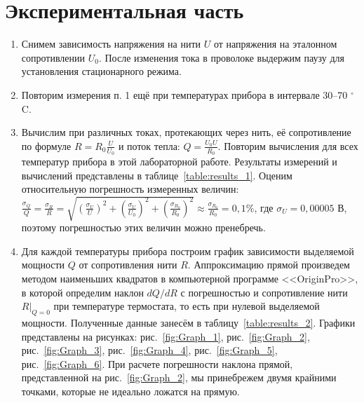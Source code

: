 \documentclass[a4paper,12pt]{article} %
\begin{document}
\section{Экспериментальная часть}
\begin{enumerate}

\item
	Снимем зависимость напряжения на нити $U$ от напряжения на 	эталонном сопротивлении 	$U_0$. После изменения тока в проволоке выдержим паузу для установления стационарного 	режима.
	
\item
	Повторим измерения п. 1 ещё при температурах прибора в интервале 30--70 $^\circ$C.

\item
	Вычислим при различных токах, протекающих через нить, её сопротивление по формуле $R = R_0 \frac{U}{U_0}$ и поток тепла: $Q = \frac{U_0 U}{R_0}$. Повторим вычисления для 		всех температур прибора в этой лабораторной работе. Результаты измерений и вычислений 	представлены в таблице~\ref{table:results_1}. Оценим относительную погрешность измеренных величин: $\frac{\sigma_Q}{Q} = \frac{\sigma_R}{R} = \sqrt{(\frac{\sigma_U}{U})^2+(\frac{\sigma_U}{U_0})^2+(\frac{\sigma_{R_0}}{R_0})^2}\approx \frac{\sigma_{R_0}}{R_0} = 0,1 \%$, где $\sigma_U = 0,00005$ В, поэтому погрешностью этих величин можно пренебречь.

\item
	Для каждой температуры прибора построим график зависимости выделяемой мощности $Q$ от сопротивления нити $R$. Аппроксимацию прямой произведем методом наименьших квадратов в компьютерной программе <<OriginPro>>, в которой определим наклон $dQ/dR$ с погрешностью и сопротивление нити $R|_{Q = 0}$ при температуре термостата, то есть при нулевой выделяемой мощности. Полученные данные занесём в таблицу~\ref{table:results_2}. Графики представлены на рисунках: рис.~\ref{fig:Graph_1}, рис.~\ref{fig:Graph_2}, рис.~\ref{fig:Graph_3}, рис.~\ref{fig:Graph_4}, рис.~\ref{fig:Graph_5}, рис.~\ref{fig:Graph_6}. При расчете погрешности наклона прямой, представленной на рис.~\ref{fig:Graph_2}, мы принебрежем двумя крайними точками, которые не идеально ложатся на прямую.




\end{enumerate}
\end{document}
